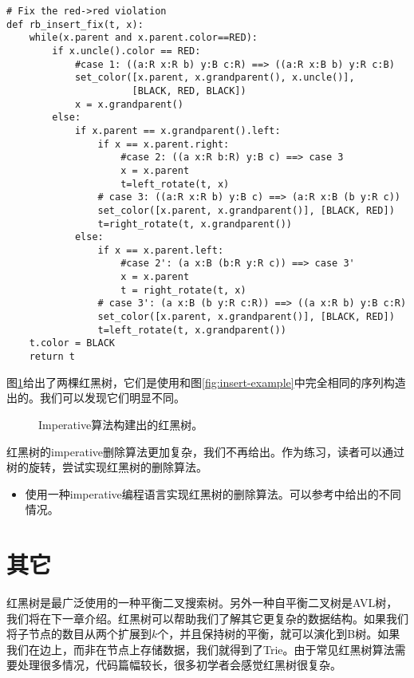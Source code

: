 \documentclass[UTF8]{article}
\begin{document}
\begin{lstlisting}
# Fix the red->red violation
def rb_insert_fix(t, x):
    while(x.parent and x.parent.color==RED):
        if x.uncle().color == RED:
            #case 1: ((a:R x:R b) y:B c:R) ==> ((a:R x:B b) y:R c:B)
            set_color([x.parent, x.grandparent(), x.uncle()],
                      [BLACK, RED, BLACK])
            x = x.grandparent()
        else:
            if x.parent == x.grandparent().left:
                if x == x.parent.right:
                    #case 2: ((a x:R b:R) y:B c) ==> case 3
                    x = x.parent
                    t=left_rotate(t, x)
                # case 3: ((a:R x:R b) y:B c) ==> (a:R x:B (b y:R c))
                set_color([x.parent, x.grandparent()], [BLACK, RED])
                t=right_rotate(t, x.grandparent())
            else:
                if x == x.parent.left:
                    #case 2': (a x:B (b:R y:R c)) ==> case 3'
                    x = x.parent
                    t = right_rotate(t, x)
                # case 3': (a x:B (b y:R c:R)) ==> ((a x:R b) y:B c:R)
                set_color([x.parent, x.grandparent()], [BLACK, RED])
                t=left_rotate(t, x.grandparent())
    t.color = BLACK
    return t
\end{lstlisting}

图\ref{fig:imperative-insert}给出了两棵红黑树，它们是使用和图\ref{fig:insert-example}中完全相同的序列构造出的。我们可以发现它们明显不同。

\begin{figure}[htbp]
   \centering
   \caption{Imperative算法构建出的红黑树。}
   \label{fig:imperative-insert}
\end{figure}

红黑树的imperative删除算法更加复杂，我们不再给出。作为练习，读者可以通过树的旋转，尝试实现红黑树的删除算法。

\begin{Exercise}

\begin{itemize}
\item 使用一种imperative编程语言实现红黑树的删除算法。可以参考\cite{CLRS}中给出的不同情况。
\end{itemize}

\end{Exercise}

\section{其它}
红黑树是最广泛使用的一种平衡二叉搜索树。另外一种自平衡二叉树是AVL树，我们将在下一章介绍。红黑树可以帮助我们了解其它更复杂的数据结构。如果我们将子节点的数目从两个扩展到$k$个，并且保持树的平衡，就可以演化到B树。如果我们在边上，而非在节点上存储数据，我们就得到了Trie。由于常见红黑树算法需要处理很多情况，代码篇幅较长，很多初学者会感觉红黑树很复杂。
\end{document}
